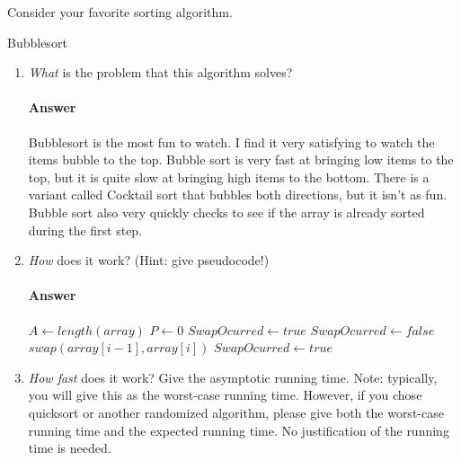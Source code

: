 \documentclass{article}
\begin{document}
\collab{}
Consider your favorite sorting algorithm.

Bubblesort
\begin{enumerate}
      \item \emph{What} is the problem that this algorithm solves?
            
            \paragraph{Answer} Bubblesort is the most fun to watch. I find it very
            satisfying to watch the items bubble to the top.
            Bubble sort is very fast at bringing low items to the top, but it is quite
            slow at bringing high items to the bottom. There is a variant called Cocktail sort
            that bubbles both directions, but it isn't as fun. Bubble sort also very quickly checks
            to see if the array is already sorted during the first step.
            
      \item \emph{How} does it work? (Hint: give pseudocode!)
            
            \paragraph{Answer}
            
            \begin{algorithmic}
                  \State $A \gets length(array)$
                  \State $P \gets 0$
                  \State $SwapOcurred \gets true$
                  \State $SwapOcurred \gets false$
                  \State $swap(array[i-1], array[i])$
                  \State $SwapOcurred \gets true$
                  \EndIf
                  \EndFor
                  \EndWhile
            \end{algorithmic}
            
      \item \emph{How fast} does it work?  Give the asymptotic running time.
            Note: typically, you will give this as the worst-case running time.
            However, if you chose quicksort or another randomized algorithm, please
            give both the worst-case running time and the expected running time.  No
            justification of the running time is needed.
            

\end{enumerate}
\end{document}
